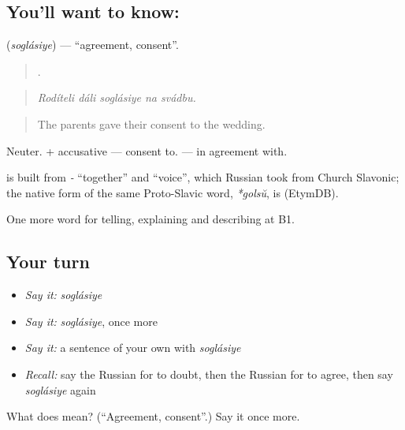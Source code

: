\subsection*{You'll want to know: }
\textbf{} (\emph{soglásiye}) — \textquotedblleft{}agreement, consent\textquotedblright{}.

\begin{quote}
    .
\end{quote}

\begin{quote}
\emph{Rodíteli dáli soglásiye na svádbu.}
\end{quote}

\begin{quote}
The parents gave their consent to the wedding.
\end{quote}

Neuter. \emph{ } + accusative — consent to. \emph{  } — in agreement with.

\begin{cousinweb}
\textbf{} is built from \emph{-} \textquotedblleft{}together\textquotedblright{} and \emph{} \textquotedblleft{}voice\textquotedblright{}, which Russian took from Church Slavonic; the native form of the same Proto-Slavic word, \emph{*golsŭ}, is \emph{} (EtymDB).
\end{cousinweb}

\begin{grammarlens}[title={What you've built}]
One more word for telling, explaining and describing at B1.
\end{grammarlens}

\subsection*{Your turn}
\begin{itemize}
\raggedright
  \item \emph{Say it:} \emph{soglásiye}
  \item \emph{Say it:} \emph{soglásiye}, once more
  \item \emph{Say it:} a sentence of your own with \emph{soglásiye}
  \item \emph{Recall:} say the Russian for to doubt, then the Russian for to agree, then say \emph{soglásiye} again
\end{itemize}

\begin{tcolorbox}[breakable,colback=teal!4,colframe=teal!35!black,title={Before you move on}]
What does  mean? (\textquotedblleft{}Agreement, consent\textquotedblright{}.) Say it once more.
\end{tcolorbox}
